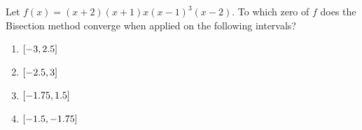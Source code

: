 \documentclass[../../../../Assignments.tex]{subfiles}
\begin{document}
\begin{exercise}
    Let \(f(x) = (x + 2) (x+1) x (x - 1)^3 (x - 2)\). To which zero of \(f\)
    does the Bisection method converge when applied on the following intervals?

    \begin{multicols}{2}
        \begin{enumerate}[label = (\alph*)]
            \item \(\interval{-3}{\num{2.5}}\)
            \item \(\interval{\num{-2.5}}{3}\)
            \item \(\interval{\num{-1.75}}{\num{1.5}}\)
            \item \(\interval{\num{-1.5}}{\num{-1.75}}\)
        \end{enumerate}
    \end{multicols}
\end{exercise}
\end{document}
